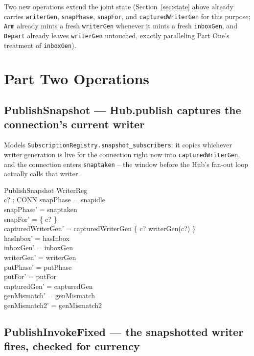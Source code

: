\documentclass[a4paper,10pt,fleqn]{article}
\begin{document}
Two new operations extend the joint state
(Section~\ref{sec:state} above already carries \texttt{writerGen},
\texttt{snapPhase}, \texttt{snapFor}, and \texttt{capturedWriterGen} for
this purpose; \texttt{Arm} already mints a fresh \texttt{writerGen} whenever
it mints a fresh \texttt{inboxGen}, and \texttt{Depart} already leaves
\texttt{writerGen} untouched, exactly paralleling Part One's treatment of
\texttt{inboxGen}).

\section{Part Two Operations}

\subsection{PublishSnapshot --- Hub.publish captures the connection's current writer}

Models \texttt{SubscriptionRegistry.snapshot\_subscribers}: it copies
whichever writer generation is live for the connection right now into
\texttt{capturedWriterGen}, and the connection enters \texttt{snaptaken} --
the window before the Hub's fan-out loop actually calls that writer.

\begin{schema}{PublishSnapshot}
  \Delta WriterReg \\
  c? : CONN
\where
  snapPhase = snapidle \\
  snapPhase' = snaptaken \\
  snapFor' = \{ c? \} \\
  capturedWriterGen' = capturedWriterGen \oplus \{ c? \mapsto writerGen(c?) \} \\
  hasInbox' = hasInbox \\
  inboxGen' = inboxGen \\
  writerGen' = writerGen \\
  putPhase' = putPhase \\
  putFor' = putFor \\
  capturedGen' = capturedGen \\
  genMismatch' = genMismatch \\
  genMismatch2' = genMismatch2
\end{schema}

\subsection{PublishInvokeFixed --- the snapshotted writer fires, checked for currency}
\label{sec:publishinvokefixed}
\end{document}
